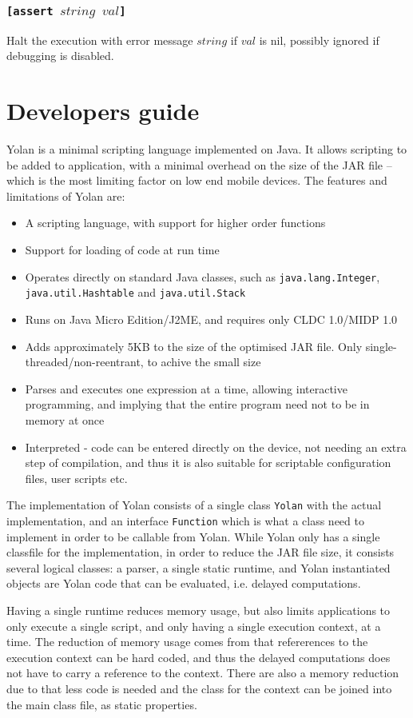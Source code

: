 \documentclass[11pt]{report}
\begin{document}
\subsubsection*{\tt{[assert }$string$ $val$\tt{]}}
Halt the execution with error message $string$ if $val$ is nil, possibly ignored if debugging is disabled.


\section{Developers guide}
Yolan is a minimal scripting language implemented on Java.
It allows scripting to be added to application, with a minimal overhead on the size of the JAR file -- which is the most limiting factor on low end mobile devices. The features and limitations of Yolan are:
\begin{itemize}
\item A scripting language, with support for higher order functions
\item Support for loading of code at run time
\item Operates directly on standard Java classes, such as \verb|java.lang.Integer|, \verb|java.util.Hashtable| and \verb|java.util.Stack|
\item Runs on Java Micro Edition/J2ME, and requires only CLDC 1.0/MIDP 1.0
\item Adds approximately 5KB to the size of the optimised JAR file. Only single-threaded/non-reentrant, to achive the small size
\item Parses and executes one expression at a time, allowing interactive programming, and implying that the entire program need not to be in memory at once
\item Interpreted - code can be entered directly on the device, not needing an extra step of compilation, and thus it is also suitable for scriptable configuration files, user scripts etc.
\end{itemize}

The implementation of Yolan consists of a single class \verb|Yolan| with the actual implementation, and an interface \verb|Function| which is what a class need to implement in order to be callable from Yolan.
While Yolan only has a single classfile for the implementation, in order to reduce the JAR file size, it consists several logical classes: a parser, a single static runtime, and Yolan instantiated objects are Yolan code that can be evaluated, i.e. delayed computations.

Having a single runtime reduces memory usage, but also limits applications to only execute a single script, and only having a single execution context, at a time. The reduction of memory usage comes from that refererences to the execution context can be hard coded, and thus the delayed computations does not have to carry a reference to the context. There are also a memory reduction due to that less code is needed and the class for the context can be joined into the main class file, as static properties.
\end{document}
